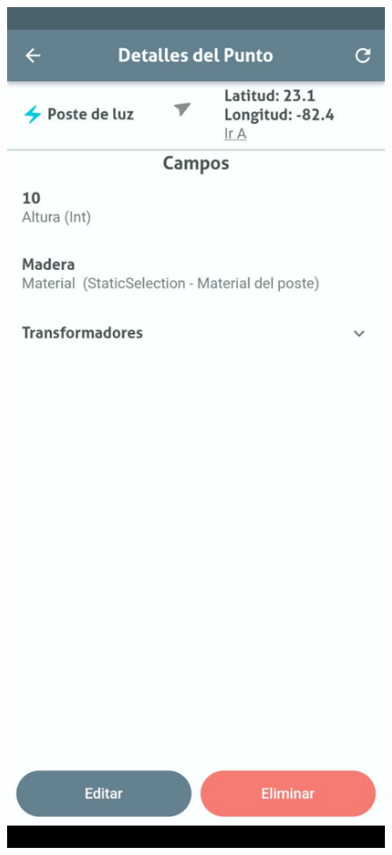 \documentclass{article}
\begin{document}
\begin{figure}[H]
  \centering
  \begin{minipage}[b]{0.3\textwidth}
    \centering
    \includegraphics[width=\textwidth]{images/functionality_test/geodata_view1.jpg}

\end{minipage}
\end{figure}
\end{document}
